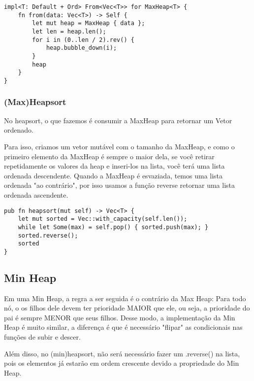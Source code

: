 \begin{lstlisting}
impl<T: Default + Ord> From<Vec<T>> for MaxHeap<T> {
    fn from(data: Vec<T>) -> Self {
        let mut heap = MaxHeap { data };
        let len = heap.len();
        for i in (0..len / 2).rev() {
            heap.bubble_down(i);
        }
        heap
    }
}
\end{lstlisting}

\subsubsection{(Max)Heapsort}

No heapsort, o que fazemos é consumir a MaxHeap para retornar um Vetor ordenado.

Para isso, criamos um vetor mutável com o tamanho da MaxHeap, e como o primeiro elemento
da MaxHeap é sempre o maior dela, se você retirar repetidamente os valores da heap e inseri-los na lista, você
terá uma lista ordenada descendente. Quando a MaxHeap é esvaziada, temos uma lista ordenada
"ao contrário", por isso usamos a função reverse retornar uma lista ordenada ascendente.

\begin{lstlisting}
pub fn heapsort(mut self) -> Vec<T> {
    let mut sorted = Vec::with_capacity(self.len());
    while let Some(max) = self.pop() { sorted.push(max); }
    sorted.reverse();
    sorted
}
\end{lstlisting}

\subsection{Min Heap}

Em uma Min Heap, a regra a ser seguida é o contrário da Max Heap: Para todo nó,
o os filhos dele devem ter prioridade MAIOR que ele, ou seja, a prioridade do pai
é sempre MENOR que seus filhos. 
Desse modo, a implementação da Min Heap
é muito similar, a diferença é que é necessário "flipar" as condicionais nas funções de subir
e descer. 

Além disso, no (min)heapsort, não será necessário fazer um .reverse() na lista, pois os elementos 
já estarão em ordem crescente devido a propriedade do Min Heap.
